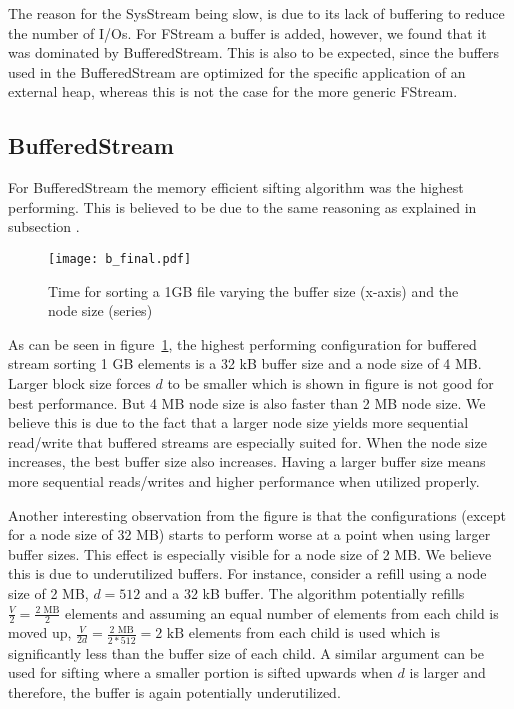The reason for the SysStream being slow, is due to its lack of buffering to reduce the number of I/Os. For FStream a buffer is added, however, we found that it was dominated by BufferedStream. This is also to be expected, since the buffers used in the BufferedStream are optimized for the specific application of an external heap, whereas this is not the case for the more generic FStream.

\subsection{BufferedStream}

For BufferedStream the memory efficient sifting algorithm was the highest performing. This is believed to be due to the same reasoning as explained in subsection .

\begin{figure}[h!]
  \centering
  \texttt{[image: b\_final.pdf]}
  \caption{Time for sorting a 1GB file varying the buffer size (x-axis) and the node size (series)}
  \label{fig:b_final}
\end{figure}

As can be seen in figure~\ref{fig:b_final}, the highest performing configuration for buffered stream sorting 1 GB elements is a 32 kB buffer size and a node size of 4 MB. Larger block size forces $d$ to be smaller which is shown in figure  is not good for best performance. But 4 MB node size is also faster than 2 MB node size. We believe this is due to the fact that a larger node size yields more sequential read/write that buffered streams are especially suited for. When the node size increases, the best buffer size also increases. Having a larger buffer size means more sequential reads/writes and higher performance when utilized properly.

Another interesting observation from the figure is that the configurations (except for a node size of 32 MB) starts to perform worse at a point when using larger buffer sizes. This effect is especially visible for a node size of 2 MB. We believe this is due to underutilized buffers. For instance, consider a refill using a node size of 2 MB, $d=512$ and a 32 kB buffer. The algorithm potentially refills $\frac{V}{2}=\frac{\textrm{2 MB}}{2}$ elements and assuming an equal number of elements from each child is moved up, $\frac{V}{2d}=\frac{\textrm{2 MB}}{2*512}=\textrm{2 kB}$ elements from each child is used which is significantly less than the buffer size of each child. A similar argument can be used for sifting where a smaller portion is sifted upwards when $d$ is larger and therefore, the buffer is again potentially underutilized.

